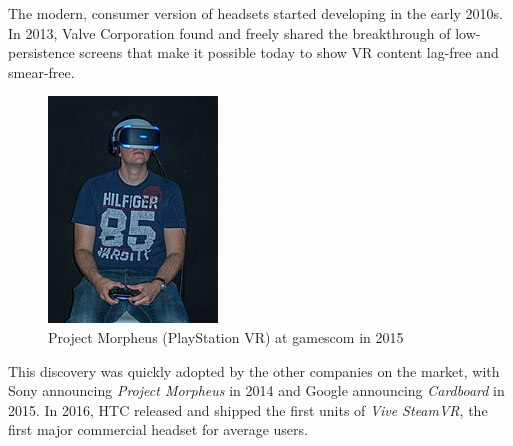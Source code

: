 \documentclass[12pt,a4paper,twoside]{report}
\begin{document}
The modern, consumer version of headsets started developing in the early 2010s. In 2013, Valve Corporation found and freely shared the breakthrough of low-persistence screens that make it possible today to show VR content lag-free and smear-free. 

\begin{figure}
  \includegraphics[width=1.1\linewidth]{img/Sony_morpheus.jpg}
  \caption[]{Project Morpheus (PlayStation VR) at gamescom in 2015 \footnotemark}
  \label{fig:morpheus}
\end{figure}


This discovery was quickly adopted by the other companies on the market, with Sony announcing \textit{Project Morpheus} in 2014 and Google announcing \textit{Cardboard} in 2015. In 2016, HTC released and shipped the first units of \textit{Vive SteamVR}, the first major commercial headset for average users.
\end{document}

